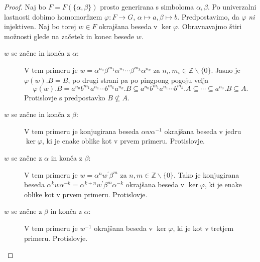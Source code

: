 \documentclass[11pt]{book}
\def\ZZ{\mathbb{Z}}
\theoremstyle{definition}
\theoremstyle{zgled}
\theoremstyle{odprtproblem}
\theoremstyle{domacanaloga}
\newenvironment{dokaz}
    {\color{siva}\begin{proof}}
    {\end{proof}}
\theoremstyle{izrek}
\begin{document}
\begin{dokaz}
Naj bo $F = F(\{ \alpha, \beta \})$ prosto generirana s simboloma $\alpha, \beta$. Po univerzalni lastnosti dobimo homomorfizem $\varphi \colon F \to G$, $\alpha \mapsto a, \beta \mapsto b$. Predpostavimo, da $\varphi$ {\em ni} injektiven. Naj bo torej $w \in F$ okrajšana beseda v $\ker \varphi$. Obravnavajmo štiri možnosti glede na začetek in konec besede $w$.

\begin{description}
\item[$w$ se začne in konča z $\alpha$:] V tem primeru je $w = \alpha^{n_0} \beta^{m_1} \alpha^{n_1} \cdots \beta^{m_k} \alpha^{n_k}$ za $n_i, m_i \in \ZZ \backslash \{ 0 \}$. Jasno je $\varphi(w).B = B$, po drugi strani pa po pingpong pogoju velja
\[
\varphi(w).B = a^{n_0} b^{m_1} a^{n_1} \cdots b^{m_k} a^{n_k}.B \subseteq a^{n_0} b^{m_1} a^{n_1} \cdots b^{m_k}.A \subseteq \cdots \subseteq a^{n_0}.B \subseteq A.
\]
Protislovje s predpostavko $B \not\subseteq A$.

\item[$w$ se začne in konča z $\beta$:] V tem primeru je konjugirana beseda $\alpha w \alpha^{-1}$ okrajšana beseda v jedru $\ker \varphi$, ki je enake oblike kot v prvem primeru. Protislovje.

\item[$w$ se začne z $\alpha$ in konča z $\beta$:] V tem primeru je $w = \alpha^n w^\prime \beta^m$ za $n,m \in \ZZ \backslash \{ 0 \}$. Tako je konjugirana beseda $\alpha^k w \alpha^{-k} = \alpha^{k+n} w^\prime \beta^m \alpha^{-k}$ okrajšana beseda v $\ker \varphi$, ki je enake oblike kot v prvem primeru. Protislovje.

\item[$w$ se začne z $\beta$ in konča z $\alpha$:] V tem primeru je $w^{-1}$ okrajšana beseda v $\ker \varphi$, ki je kot v tretjem primeru. Protislovje.
\end{description}
\end{dokaz}
\end{document}
